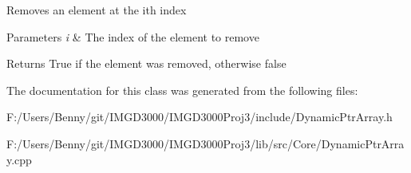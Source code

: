 Removes an element at the ith index 
\begin{DoxyParams}{Parameters}
{\em i} & The index of the element to remove \\
\hline
\end{DoxyParams}
\begin{DoxyReturn}{Returns}
True if the element was removed, otherwise false 
\end{DoxyReturn}


The documentation for this class was generated from the following files\+:\begin{DoxyCompactItemize}
\item 
F\+:/\+Users/\+Benny/git/\+I\+M\+G\+D3000/\+I\+M\+G\+D3000\+Proj3/include/Dynamic\+Ptr\+Array.\+h\item 
F\+:/\+Users/\+Benny/git/\+I\+M\+G\+D3000/\+I\+M\+G\+D3000\+Proj3/lib/src/\+Core/Dynamic\+Ptr\+Array.\+cpp\end{DoxyCompactItemize}

